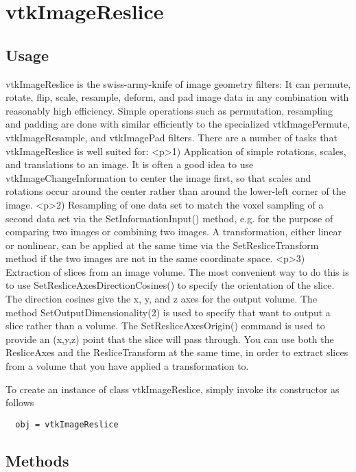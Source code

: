 \section{vtkImageReslice}

\subsection{Usage}

 vtkImageReslice is the swiss-army-knife of image geometry filters:  
 It can permute, rotate, flip, scale, resample, deform, and pad image
 data in any combination with reasonably high efficiency.  Simple
 operations such as permutation, resampling and padding are done
 with similar efficiently to the specialized vtkImagePermute,
 vtkImageResample, and vtkImagePad filters.  There are a number of
 tasks that vtkImageReslice is well suited for:
 <p>1) Application of simple rotations, scales, and translations to
 an image. It is often a good idea to use vtkImageChangeInformation
 to center the image first, so that scales and rotations occur around
 the center rather than around the lower-left corner of the image.
 <p>2) Resampling of one data set to match the voxel sampling of 
 a second data set via the SetInformationInput() method, e.g. for
 the purpose of comparing two images or combining two images.
 A transformation, either linear or nonlinear, can be applied 
 at the same time via the SetResliceTransform method if the two
 images are not in the same coordinate space.
 <p>3) Extraction of slices from an image volume.  The most convenient
 way to do this is to use SetResliceAxesDirectionCosines() to
 specify the orientation of the slice.  The direction cosines give
 the x, y, and z axes for the output volume.  The method 
 SetOutputDimensionality(2) is used to specify that want to output a
 slice rather than a volume.  The SetResliceAxesOrigin() command is
 used to provide an (x,y,z) point that the slice will pass through.
 You can use both the ResliceAxes and the ResliceTransform at the
 same time, in order to extract slices from a volume that you have
 applied a transformation to.

To create an instance of class vtkImageReslice, simply
invoke its constructor as follows
\begin{verbatim}
  obj = vtkImageReslice
\end{verbatim}
\subsection{Methods}

